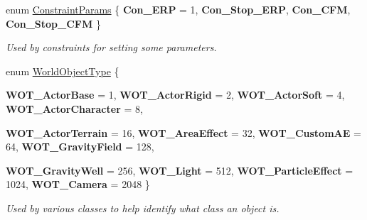 \begin{DoxyCompactItemize}
enum \hyperlink{namespacephys_a3d9969958345dec81ed83544445e3c28}{ConstraintParams} \{ {\bfseries Con\_\-ERP} =  1, 
{\bfseries Con\_\-Stop\_\-ERP}, 
{\bfseries Con\_\-CFM}, 
{\bfseries Con\_\-Stop\_\-CFM}
 \}
\begin{DoxyCompactList}\small\item\em Used by constraints for setting some parameters. \item\end{DoxyCompactList}\item 
enum \hyperlink{namespacephys_a56410935e1c614a932dbc91ee7330df1}{WorldObjectType} \{ \par
{\bfseries WOT\_\-ActorBase} =  1, 
{\bfseries WOT\_\-ActorRigid} =  2, 
{\bfseries WOT\_\-ActorSoft} =  4, 
{\bfseries WOT\_\-ActorCharacter} =  8, 
\par
{\bfseries WOT\_\-ActorTerrain} =  16, 
{\bfseries WOT\_\-AreaEffect} =  32, 
{\bfseries WOT\_\-CustomAE} =  64, 
{\bfseries WOT\_\-GravityField} =  128, 
\par
{\bfseries WOT\_\-GravityWell} =  256, 
{\bfseries WOT\_\-Light} =  512, 
{\bfseries WOT\_\-ParticleEffect} =  1024, 
{\bfseries WOT\_\-Camera} =  2048
 \}
\begin{DoxyCompactList}\small\item\em Used by various classes to help identify what class an object is. \item\end{DoxyCompactList}\end{DoxyCompactItemize}
